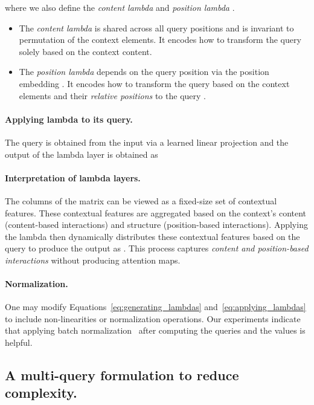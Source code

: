 \documentclass{article} \usepackage{iclr2021_conference,times}
\begin{document}
where we also define the \emph{content lambda}  and \emph{position lambda} .
\begin{itemize}
    \item The \emph{content lambda}  is shared across all query positions  and is invariant to permutation of the context elements. It encodes how to transform the query  solely based on the context content.
    \item The \emph{position lambda}  depends on the query position  via the position embedding . It encodes how to transform the query  based on the context elements  and their \emph{relative positions} to the query .
\end{itemize}

\vspace{-0.1cm}
\paragraph{Applying lambda to its query.}
The query  is obtained from the input  via a learned linear projection and the output of the lambda layer is obtained as


\vspace{-0.1cm}
\paragraph{Interpretation of lambda layers.}
The columns of the  matrix can be viewed as a fixed-size set of  contextual features.
These contextual features are aggregated based on the context's content (content-based interactions) and structure (position-based interactions).
Applying the lambda then dynamically distributes these contextual features based on the query to produce the output as .
This process captures \emph{content and position-based interactions} without producing attention maps.

\vspace{-0.1cm}
\paragraph{Normalization.}
One may modify Equations~\ref{eq:generating_lambdas} and~\ref{eq:applying_lambdas} to include non-linearities or normalization operations.
Our experiments indicate that applying batch normalization~\citep{BatchNorm} after computing the queries and the values is helpful.

\subsection{A multi-query formulation to reduce complexity.}
\end{document}
